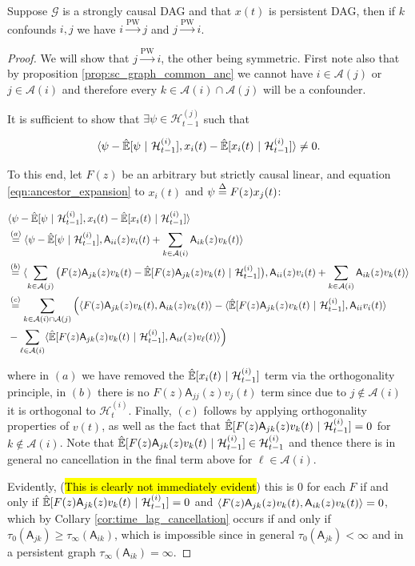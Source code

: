 \documentclass[12pt]{article}
\def\pwgc{\overset{\text{PW}}{\rightarrow}}  %
\def\gcg{\mathcal{G}}  %
\def\A{\mathsf{A}}  %
\def\H{\mathcal{H}}  %
\newcommand{\linE}[2]{\hat{\E}[#1\ |\ #2]}  %
\newcommand{\anc}[1]{\mathcal{A}(#1)}  %
\begin{document}
\begin{proposition}
  Suppose $\gcg$ is a strongly causal DAG and that $x(t)$ is persistent DAG, then if $k$
  confounds $i, j$ we have $i \pwgc j$ and $j \pwgc i$.
\end{proposition}
\begin{proof}
  We will show that $j \pwgc i$, the other being symmetric.  First
  note also that by proposition \ref{prop:sc_graph_common_anc} we
  cannot have $i \in \anc{j}$ or $j \in \anc{i}$ and therefore every
  $k \in \anc{i}\cap\anc{j}$ will be a confounder.

  It is sufficient to show that $\exists \psi \in \H_{t - 1}^{(j)}$
  such that

  \begin{equation*}
    \inner{\psi - \linE{\psi}{\H_{t - 1}^{(i)}}}{x_i(t) - \linE{x_i(t)}{\H_{t - 1}^{(i)}}} \ne 0.
  \end{equation*}

  To this end, let $F(z)$ be an arbitrary but strictly causal linear,
  and equation \eqref{eqn:ancestor_expansion} to $x_i(t)$ and
  $\psi \overset{\Delta}{=} F(z)x_j(t)$:

  \begin{align*}
    &\inner{\psi - \linE{\psi}{\H_{t - 1}^{(i)}}}{x_i(t) - \linE{x_i(t)}{\H_{t - 1}^{(i)}}}\\
    &\overset{(a)}{=} \inner{\psi - \linE{\psi}{\H_{t - 1}^{(i)}}}{\A_{ii}(z)v_i(t) + \sum_{k \in \anc{i}}\A_{ik}(z)v_k(t)}\\
    &\overset{(b)}{=} \inner{\sum_{k \in \anc{j}}\big(F(z)\A_{jk}(z)v_k(t) - \linE{F(z)\A_{jk}(z)v_k(t)}{\H_{t - 1}^{(i)}}\big)}{\A_{ii}(z)v_i(t) + \sum_{k \in \anc{i}}\A_{ik}(z)v_k(t)}\\
    &\overset{(c)}{=} \sum_{k \in \anc{i}\cap\anc{j}}\Big(\inner{F(z)\A_{jk}(z)v_k(t)}{\A_{ik}(z)v_k(t)} - \inner{\linE{F(z)\A_{jk}(z)v_k(t)}{\H_{t - 1}^{(i)}}}{\A_{ii}v_i(t)}\\
    &- \sum_{\ell \in \anc{i}}\inner{\linE{F(z)\A_{jk}(z)v_k(t)}{\H_{t - 1}^{(i)}}}{\A_{i\ell}(z)v_\ell(t)}\Big)
  \end{align*}

  where in $(a)$ we have removed the $\linE{x_i(t)}{\H_{t - 1}^{(i)}}$
  term via the orthogonality principle, in $(b)$ there is no
  $F(z)\A_{jj}(z)v_j(t)$ term since due to $j \not\in \anc{i}$ it is
  orthogonal to $\H_t^{(i)}$.  Finally, $(c)$ follows by applying
  orthogonality properties of $v(t)$, as well as the fact that
  $\linE{F(z)\A_{jk}(z)v_k(t)}{\H_{t - 1}^{(i)}} = 0$ for
  $k \not \in \anc{i}$.  Note that
  $\linE{F(z)\A_{jk}(z)v_k(t)}{\H_{t - 1}^{(i)}} \in \H_{t - 1}^{(i)}$
  and thence there is in general no cancellation in the final term
  above for $\ell \in \anc{i}$.

  Evidently, (\hl{This is clearly not immediately evident}) this is
  $0$ for each $F$ if and only if
  $\linE{F(z)\A_{jk}(z)v_k(t)}{\H_{t - 1}^{(i)}} = 0$ and
  $\inner{F(z)\A_{jk}(z)v_k(t)}{\A_{ik}(z)v_k(t)} = 0$, which by
  Collary \ref{cor:time_lag_cancellation} occurs if and only if
  $\tau_0(\A_{jk}) \ge \tau_\infty(\A_{ik})$, which is impossible
  since in general $\tau_0(\A_{jk}) < \infty$ and in a persistent
  graph $\tau_\infty(\A_{ik}) = \infty$.
\end{proof}
\end{document}
